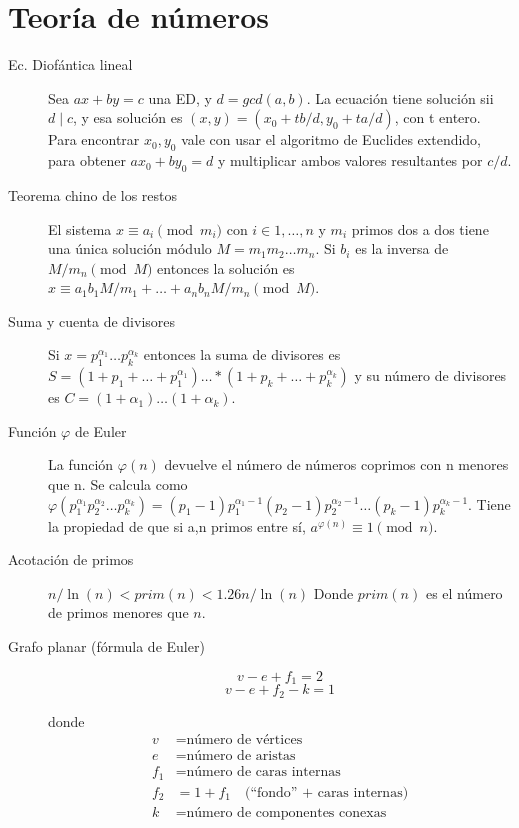 \section{Teoría de números}
\begin{description}
	\item[Ec. Diofántica lineal]
		Sea $ax+by=c$ una ED, y $d=gcd(a,b)$.
		La ecuación tiene solución sii $d \mid c$, y esa solución es $(x,y)=(x_0+tb/d, y_0+ta/d)$,
		con t entero. Para encontrar $x_0,y_0$ vale con usar el
		algoritmo de Euclides extendido, para obtener $ax_0+by_0=d$ y multiplicar
		ambos valores resultantes por $c/d$.
	\item[Teorema chino de los restos]
		El sistema $x\equiv a_i \pmod{m_i}$ con $i\in 1,\dots,n$ y $m_i$ primos dos a dos
		tiene una única solución módulo $M=m_1m_2\dots m_n$. Si $b_i$ es la inversa de $M/m_n \pmod{M}$
		entonces la solución es $x\equiv a_1b_1M/m_1+\dots+a_nb_nM/m_n \pmod{M}$.
	\item[Suma y cuenta de divisores]
		Si $x=p_1^{\alpha_1}\dots p_k^{\alpha_k}$ entonces la suma de divisores es
		$S=(1+p_1+\dots+p_1^{\alpha_1})\dots*(1+p_k+\dots+p_k^{\alpha_k})$
		y su número de divisores es $C=(1+\alpha _1)\dots(1+\alpha_k)$.
	\item[Función $\varphi$ de Euler]
		La función $\varphi(n)$ devuelve el número de números coprimos con n menores que n. Se calcula como
		$\varphi(p_1^{\alpha_1}p_2^{\alpha_2}\dots p_k^{\alpha_k})=(p_1-1)p_1^{\alpha_1-1}(p_2-1)p_2^{\alpha_2-1}\dots (p_k-1)p_k^{\alpha_k-1}$.
		Tiene la propiedad de que si a,n primos entre sí, $a^{\varphi(n)}\equiv 1 \pmod{n}$.
	\item[Acotación de primos]
		$n/\ln(n)<prim(n)<1.26 n/\ln(n)$ Donde $prim(n)$ es el número de primos menores que $n$.
	\item[Grafo planar (fórmula de Euler)]
		\[v - e + f_1 = 2\]
		\[v - e + f_2 - k = 1\] 
		
		donde
		\begin{align*}
			v &= \text{número de vértices}\\
			e &= \text{número de aristas}\\
			f_1 &= \text{número de caras internas}\\
			f_2 &= 1 + f_1 \quad \text{(``fondo'' + caras internas)}\\
			k &= \text{número de componentes conexas}
		\end{align*}
\end{description}


%


